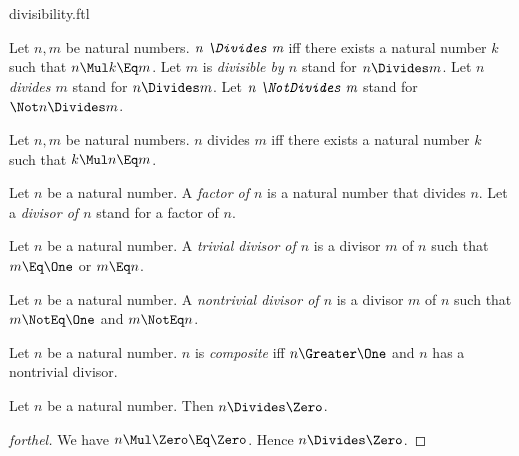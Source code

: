 \documentclass{stex}
\begin{document}
\begin{smodule}{divisibility.ftl}




\begin{definition*}[forthel,for={divisible,divide}]
  Let $n, m$ be natural numbers.
  $\emph{n \Divides m}$ iff there exists a natural number $k$ such that $n \Mul k \Eq m$.
  Let $m$ is \emph{divisible by $n$} stand for $n \Divides m$.
  Let $n$ \emph{divides $m$} stand for $n \Divides m$.
  Let $\emph{n \NotDivides m}$ stand for $\Not n \Divides m$.
\end{definition*}

\begin{lemma*}[forthel]
  Let $n, m$ be natural numbers.
  $n$ divides $m$ iff there exists a natural number $k$ such that $k \Mul n \Eq m$.
\end{lemma*}

\begin{definition*}[forthel,for={factor,divisor}]
  Let $n$ be a natural number.
  A \emph{factor of $n$} is a natural number that divides $n$.
  Let a \emph{divisor of $n$} stand for a factor of $n$.
\end{definition*}

\begin{definition*}[forthel,for=trivial divisor]
  Let $n$ be a natural number.
  A \emph{trivial divisor of $n$} is a divisor $m$ of $n$ such that $m \Eq \One$ or $m \Eq n$.
\end{definition*}

\begin{definition*}[forthel,for=nontrivial divisor]
  Let $n$ be a natural number.
  A \emph{nontrivial divisor of $n$} is a divisor $m$ of $n$ such that $m \NotEq \One$ and $m \NotEq n$.
\end{definition*}

\begin{definition*}[forthel]
  Let $n$ be a natural number.
  $n$ is \emph{composite} iff $n \Greater \One$ and $n$ has a nontrivial divisor.
\end{definition*}

\begin{proposition*}[forthel]
  Let $n$ be a natural number.
  Then $n \Divides \Zero$.
\end{proposition*}
\begin{proof}[forthel]
  We have $n \Mul \Zero \Eq \Zero$.
  Hence $n \Divides \Zero$.
\end{proof}


\end{smodule}
\end{document}
